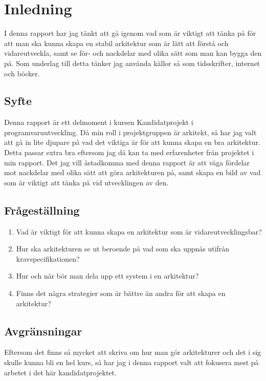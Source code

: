 \section{Inledning}
I denna rapport har jag tänkt att gå igenom vad som är viktigt att tänka på för att man ska kunna skapa en stabil arkitektur som är lätt att förstå och vidareutveckla, samt se för- och nackdelar med olika sätt som man kan bygga den på.
\newline
\newline
Som underlag till detta tänker jag använda källor så som tidsskrifter, internet och böcker.   

\subsection{Syfte}
Denna rapport är ett delmoment i kursen Kandidatprojekt i programvaruutveckling. Då min roll i projektgruppen är arkitekt, så har jag valt att gå in lite djupare på vad det viktiga är för att kunna skapa en bra arkitektur. Detta passar extra bra eftersom jag då kan ta med erfarenheter från projektet i min rapport.
Det jag vill åstadkomma med denna rapport är att väga fördelar mot nackdelar med olika sätt att göra arkitekturen på, samt skapa en bild av vad som är viktigt att tänka på vid utvecklingen av den.

\subsection{Frågeställning}
\begin{enumerate}
	\item Vad är viktigt för att kunna skapa en arkitektur som är vidareutvecklingsbar?
	\item Hur ska arkitekturen se ut beroende på vad som ska uppnås utifrån kravspecifikationen?
	\item Hur och när bör man dela upp ett system i en arkitektur?
	\item Finns det några strategier som är bättre än andra för att skapa en arkitektur?
\end{enumerate}

\subsection{Avgränsningar}
Eftersom det finns så mycket att skriva om hur man gör arkitekturer och det i sig skulle kunna bli en hel kurs, så har jag i denna rapport valt att fokusera mest på arbetet i det här kandidatprojektet.



